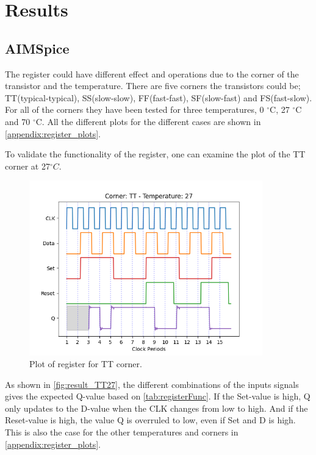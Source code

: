 \section{Results}
\label{sec:results}

\subsection{AIMSpice}

The register could have different effect and operations due to the corner of the transistor and the temperature. There are five corners the transistors could be; TT(typical-typical), SS(slow-slow), FF(fast-fast), SF(slow-fast) and FS(fast-slow).  For all of the corners they have been tested for three temperatures, 0 $^\circ$C, 27 $^\circ$C and 70 $^\circ$C. All the different plots for the different cases are shown in \autoref{appendix:register_plots}. 

To validate the functionality of the register, one can examine the plot of the TT corner at 27$^\circ C$. 

\begin{figure}[H]
    \centering
    \includegraphics[width=0.9\textwidth]{Figures/Aimspice_Plots/TT_27.png}
    \caption{Plot of register for TT corner.}
    \label{fig:result_TT27}
\end{figure}

As shown in \autoref{fig:result_TT27}, the different combinations of the inputs signals gives the expected Q-value based on \autoref{tab:registerFunc}. If the Set-value is high, Q only updates to the D-value when the CLK changes from low to high. And if the Reset-value is high, the value Q is overruled to low, even if Set and D is high. This is also the case for the other temperatures and corners in \autoref{appendix:register_plots}.

